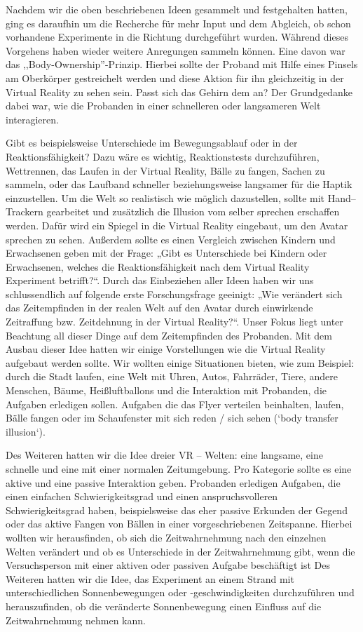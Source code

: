 \documentclass{Bericht}
\begin{document}
	Nachdem wir die oben beschriebenen Ideen gesammelt und festgehalten hatten, ging es daraufhin um die Recherche für mehr Input und dem Abgleich, ob schon vorhandene Experimente in die Richtung durchgeführt wurden. Während dieses Vorgehens haben wieder weitere Anregungen sammeln können. Eine davon war das ,,Body-Ownership''-Prinzip. Hierbei sollte der Proband mit Hilfe eines Pinsels am Oberkörper gestreichelt werden und diese Aktion für ihn gleichzeitig in der Virtual Reality zu sehen sein. 
Passt sich das Gehirn dem an? Der Grundgedanke dabei war, wie die Probanden in einer schnelleren oder langsameren Welt interagieren. 

Gibt es beispielsweise Unterschiede im Bewegungsablauf oder in der Reaktionsfähigkeit? Dazu wäre es wichtig, Reaktionstests durchzuführen, Wettrennen, das Laufen in der Virtual Reality, Bälle zu fangen, Sachen zu sammeln, oder das Laufband schneller beziehungsweise langsamer für die Haptik einzustellen. Um die Welt so realistisch wie möglich dazustellen, sollte mit Hand–Trackern gearbeitet und zusätzlich die Illusion vom selber sprechen erschaffen werden. Dafür wird ein Spiegel in die Virtual Reality eingebaut, um den Avatar sprechen zu sehen. Außerdem sollte es einen Vergleich zwischen Kindern und Erwachsenen geben mit der Frage: „Gibt es Unterschiede bei Kindern oder Erwachsenen, welches die Reaktionsfähigkeit nach dem Virtual Reality Experiment betrifft?“. Durch das Einbeziehen aller Ideen haben wir uns schlussendlich auf folgende erste Forschungsfrage geeinigt: „Wie verändert sich das Zeitempfinden in der realen Welt auf den Avatar durch einwirkende Zeitraffung bzw. Zeitdehnung in der Virtual Reality?“. Unser Fokus liegt unter Beachtung all dieser Dinge auf dem Zeitempfinden des Probanden. Mit dem Ausbau dieser Idee hatten wir einige Vorstellungen wie die Virtual Reality aufgebaut werden sollte. Wir wollten einige Situationen bieten, wie zum Beispiel: durch die Stadt laufen, eine Welt mit Uhren, Autos, Fahrräder, Tiere, andere Menschen, Bäume, Heißluftballons und die Interaktion mit Probanden, die Aufgaben erledigen sollen. Aufgaben die das Flyer verteilen beinhalten, laufen, Bälle fangen oder im Schaufenster mit sich reden / sich sehen (‘body transfer illusion‘).

	Des Weiteren hatten wir die Idee dreier VR – Welten: eine langsame, eine schnelle und eine mit einer normalen Zeitumgebung. Pro Kategorie sollte es eine aktive und eine passive Interaktion geben. Probanden erledigen Aufgaben, die einen einfachen Schwierigkeitsgrad und einen anspruchsvolleren Schwierigkeitsgrad haben, beispielsweise das eher passive Erkunden der Gegend oder das aktive Fangen von Bällen in einer vorgeschriebenen Zeitspanne. Hierbei wollten wir herausfinden, ob sich die Zeitwahrnehmung nach den einzelnen Welten verändert und ob es Unterschiede in der Zeitwahrnehmung gibt, wenn die Versuchsperson mit einer aktiven oder passiven Aufgabe beschäftigt ist  Des Weiteren hatten wir die Idee, das Experiment an einem Strand mit unterschiedlichen Sonnenbewegungen oder -geschwindigkeiten durchzuführen und herauszufinden, ob die veränderte Sonnenbewegung einen Einfluss auf die Zeitwahrnehmung nehmen kann. 
\end{document}
